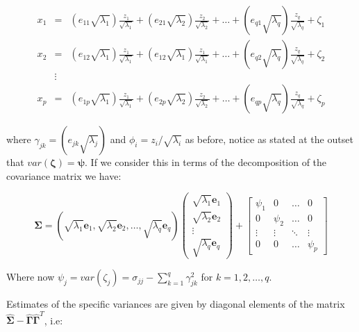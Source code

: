 \begin{eqnarray*}
x_{1} &=& (e_{11} \sqrt{\lambda_{1}}) \frac{z_{1}}{\sqrt{\lambda_{1}}} + (e_{21} \sqrt{\lambda_{2}}) \frac{z_{2}}{\sqrt{\lambda_{2}}} + \ldots +  (e_{q1} \sqrt{\lambda_{q}}) \frac{z_{q}}{\sqrt{\lambda_{q}}} +  \zeta_{1}\\
x_{2} &=& (e_{12} \sqrt{\lambda_{1}}) \frac{z_{1}}{\sqrt{\lambda_{1}}} + (e_{12} \sqrt{\lambda_{1}}) \frac{z_{1}}{\sqrt{\lambda_{1}}} + \ldots +  (e_{q2} \sqrt{\lambda_{q}}) \frac{z_{q}}{\sqrt{\lambda_{q}}} +  \zeta_{2}\\
&\vdots& \\
x_{p} &=& (e_{1p} \sqrt{\lambda_{1}}) \frac{z_{1}}{\sqrt{\lambda_{1}}} + (e_{2p} \sqrt{\lambda_{2}}) \frac{z_{2}}{\sqrt{\lambda_{2}}} + \ldots +  (e_{qp} \sqrt{\lambda_{q}}) \frac{z_{q}}{\sqrt{\lambda_{q}}} +  \zeta_{p}
\end{eqnarray*}

where $\gamma_{jk} = (e_{jk} \sqrt{\lambda_{j}})$ and $\phi_{i} = z_{i} / \sqrt{\lambda_{i}}$ as before, notice as stated at the outset that $var(\boldsymbol{\zeta}) = \boldsymbol{\psi}$.   If we consider this in terms of the decomposition of the covariance matrix we have:

\begin{equation}
\boldsymbol{\Sigma} = \left( \sqrt{\lambda_{1}} \boldsymbol{e}_{1}, \sqrt{\lambda_{2}} \boldsymbol{e}_{2}, \ldots, \sqrt{\lambda_{q}} \boldsymbol{e}_{q} \right) \left( \begin{array}{r} \sqrt{\lambda_{1}} \boldsymbol{e}_{1} \\  \sqrt{\lambda_{2}} \boldsymbol{e}_{2} \\ \vdots \\  \sqrt{\lambda_{q}} \boldsymbol{e}_{q} \end{array} \right) + 
\left[ \begin{array}{rrrr} \psi_{1} & 0 & \hdots & 0\\
0 & \psi_{2} & \hdots & 0\\
\vdots & \vdots & \ddots & \vdots\\
0 & 0 & \hdots & \psi_{p}
\end{array} \right]
\end{equation}

Where now $\psi_{j} = var(\zeta_{j}) =  \sigma_{jj} - \sum_{k=1}^{q} \gamma_{jk}^{2}$ for $k = 1, 2, \ldots, q$. 

Estimates of the specific variances are given by diagonal elements of the matrix $\boldsymbol{\hat{\Sigma}} - \boldsymbol{\hat{\Gamma}}\boldsymbol{\hat{\Gamma}}^{T}$, i.e:

